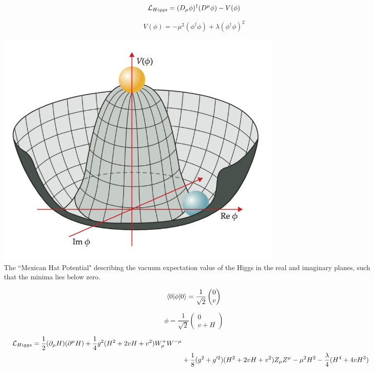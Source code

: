 \begin{equation}
\mathcal{L}_{Higgs} = (D_{\mu}\phi)^{\dagger}(D^{\mu}\phi) - V(\phi)
\end{equation}

\begin{equation}
V(\phi) = -\mu^2(\phi^{\dagger}\phi) + \lambda(\phi^{\dagger}\phi)^2
\end{equation}

\begin{figure}
\begin{center}
\includegraphics[width=0.7\textwidth]{Figures/MexicanHatPotential.png}
\caption{The ``Mexican Hat Potential" describing the vacuum expectation value of the Higgs in the real and imaginary planes, such that the minima lies below zero.}
\end{center}
\end{figure}

\begin{equation}
\braket{0|\phi|0} = \frac{1}{\sqrt{2}}
\begin{pmatrix}
0 \\
v
\end{pmatrix}
\end{equation}

\begin{equation}
\phi = \frac{1}{\sqrt{2}}
\begin{pmatrix}
0 \\
v + H
\end{pmatrix}
\end{equation}

\begin{align*}
\mathcal{L}_{Higgs} = \frac{1}{2}(\partial_{\mu}H)(\partial^{\mu}H) + \frac{1}{4}g^2 (H^2 + 2vH + v^2) W^+_{\mu} W^{-\mu} \\
& + \frac{1}{8} (g^2 + g'^2) (H^2 + 2vH + v^2) Z_{\mu} Z^{\mu} - \mu^2 H^2 - \frac{\lambda}{4} (H^4 + 4vH^3)
\end{align*}

